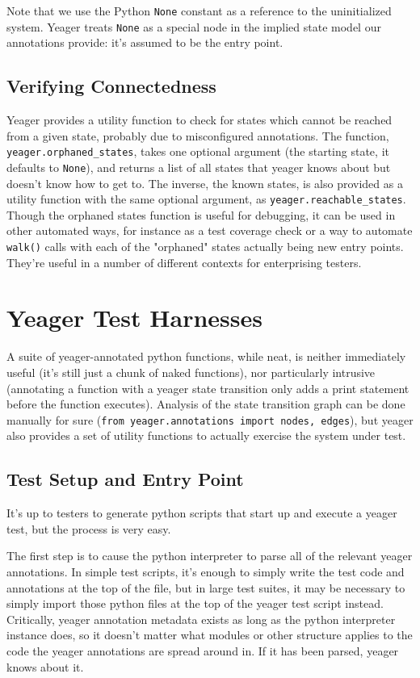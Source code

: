 Note that we use the Python \texttt{None} constant as a reference to the uninitialized system. Yeager treats \texttt{None} as a special node in the implied state model our annotations provide: it's assumed to be the entry point.

\subsection{Verifying Connectedness}
Yeager provides a utility function to check for states which cannot be reached from a given state, probably due to misconfigured annotations. The function, \texttt{yeager.orphaned\_states}, takes one optional argument (the starting state, it defaults to \texttt{None}), and returns a list of all states that yeager knows about but doesn't know how to get to. The inverse, the known states, is also provided as a utility function with the same optional argument, as \texttt{yeager.reachable\_states}. Though the orphaned states function is useful for debugging, it can be used in other automated ways, for instance as a test coverage check or a way to automate \texttt{walk()} calls with each of the "orphaned" states actually being new entry points. They're useful in a number of different contexts for enterprising testers.

\section{Yeager Test Harnesses}
A suite of yeager-annotated python functions, while neat, is neither immediately useful (it's still just a chunk of naked functions), nor particularly intrusive (annotating a function with a yeager state transition only adds a print statement before the function executes). Analysis of the state transition graph can be done manually for sure (\texttt{from yeager.annotations import nodes, edges}), but yeager also provides a set of utility functions to actually exercise the system under test.

\subsection{Test Setup and Entry Point}
It's up to testers to generate python scripts that start up and execute a yeager test, but the process is very easy.

The first step is to cause the python interpreter to parse all of the relevant yeager annotations. In simple test scripts, it's enough to simply write the test code and annotations at the top of the file, but in large test suites, it may be necessary to simply import those python files at the top of the yeager test script instead. Critically, yeager annotation metadata exists as long as the python interpreter instance does, so it doesn't matter what modules or other structure applies to the code the yeager annotations are spread around in. If it has been parsed, yeager knows about it.

